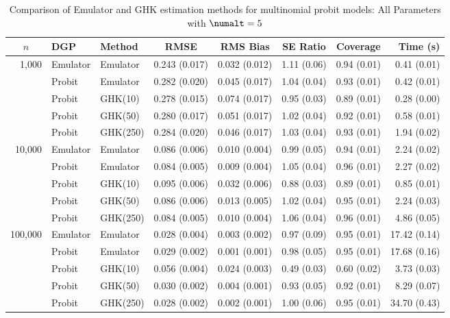 \begin{table}[htbp]
\centering
\footnotesize
\begin{tabular}{@{}rllrrrrr@{}}
\toprule
\multicolumn{1}{c}{$n$} & \multicolumn{1}{l}{DGP} & \multicolumn{1}{l}{Method} & \multicolumn{1}{c}{RMSE} & \multicolumn{1}{c}{RMS Bias} & \multicolumn{1}{c}{SE Ratio} & \multicolumn{1}{c}{Coverage} & \multicolumn{1}{r}{Time (s)} \\
\midrule
\multirow{5}{*}{1,000} & Emulator & Emulator & 0.243 (0.017) & 0.032 (0.012) & 1.11 (0.06) & 0.94 (0.01) & 0.41 (0.01) \\
 & Probit & Emulator & 0.282 (0.020) & 0.045 (0.017) & 1.04 (0.04) & 0.93 (0.01) & 0.42 (0.01) \\
 & Probit & GHK(10) & 0.278 (0.015) & 0.074 (0.017) & 0.95 (0.03) & 0.89 (0.01) & 0.28 (0.00) \\
 & Probit & GHK(50) & 0.280 (0.017) & 0.051 (0.017) & 1.02 (0.04) & 0.92 (0.01) & 0.58 (0.01) \\
 & Probit & GHK(250) & 0.284 (0.020) & 0.046 (0.017) & 1.03 (0.04) & 0.93 (0.01) & 1.94 (0.02) \\
\midrule
\multirow{5}{*}{10,000} & Emulator & Emulator & 0.086 (0.006) & 0.010 (0.004) & 0.99 (0.05) & 0.94 (0.01) & 2.24 (0.02) \\
 & Probit & Emulator & 0.084 (0.005) & 0.009 (0.004) & 1.05 (0.04) & 0.96 (0.01) & 2.27 (0.02) \\
 & Probit & GHK(10) & 0.095 (0.006) & 0.032 (0.006) & 0.88 (0.03) & 0.89 (0.01) & 0.85 (0.01) \\
 & Probit & GHK(50) & 0.086 (0.006) & 0.013 (0.005) & 1.02 (0.04) & 0.95 (0.01) & 2.24 (0.03) \\
 & Probit & GHK(250) & 0.084 (0.005) & 0.010 (0.004) & 1.06 (0.04) & 0.96 (0.01) & 4.86 (0.05) \\
\midrule
\multirow{5}{*}{100,000} & Emulator & Emulator & 0.028 (0.004) & 0.003 (0.002) & 0.97 (0.09) & 0.95 (0.01) & 17.42 (0.14) \\
 & Probit & Emulator & 0.029 (0.002) & 0.001 (0.001) & 0.98 (0.05) & 0.95 (0.01) & 17.68 (0.16) \\
 & Probit & GHK(10) & 0.056 (0.004) & 0.024 (0.003) & 0.49 (0.03) & 0.60 (0.02) & 3.73 (0.03) \\
 & Probit & GHK(50) & 0.030 (0.002) & 0.004 (0.001) & 0.93 (0.05) & 0.92 (0.01) & 8.29 (0.07) \\
 & Probit & GHK(250) & 0.028 (0.002) & 0.002 (0.001) & 1.00 (0.06) & 0.95 (0.01) & 34.70 (0.43) \\
\bottomrule
\end{tabular}
\caption{Comparison of Emulator and GHK estimation methods for multinomial probit models: All Parameters with $\numalt=5$}
\label{tab:emulator_vs_ghk:5:all}
\end{table}